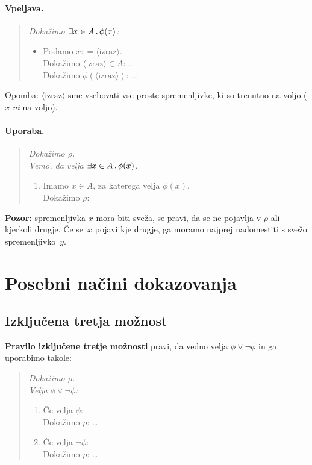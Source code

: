 \paragraph{Vpeljava.}
\begin{quote}
  \sl
  Dokažimo $\exists x \in A \,.\, \phi(x)$:
  \begin{itemize}
  \item[] Podamo $x \mathbin{{:}{=}} \langle\text{izraz}\rangle$. \\
          Dokažimo $\langle\text{izraz}\rangle \in A$: \quad \dots \\
          Dokažimo $\phi(\langle\text{izraz}\rangle)$: \quad \dots
  \end{itemize}
\end{quote}
%
Opomba: $\langle\text{izraz}\rangle$ sme vsebovati vse proste spremenljivke, ki so trenutno na voljo ($x$ \emph{ni} na
voljo).

\paragraph{Uporaba.}
\begin{quote}
  \sl
  Dokažimo $\rho$.\\
  Vemo, da velja $\exists x \in A \,.\, \phi(x)$.
  \begin{enumerate}
  \item[] Imamo $x \in A$, za katerega velja $\phi(x)$.\\
       Dokažimo $\rho$: \quad {}
  \end{enumerate}
\end{quote}
%
\textbf{Pozor:} spremenljivka $x$ mora biti sveža, se pravi, da se ne pojavlja v $\rho$ ali kjerkoli drugje. Če se~$x$ pojavi kje drugje, ga moramo najprej nadomestiti s svežo spremenljivko~$y$.

\section{Posebni načini dokazovanja}

\subsection{Izključena tretja možnost}

\textbf{Pravilo izključene tretje možnosti} pravi, da vedno velja $\phi \lor \lnot\phi$ in ga uporabimo takole:
%
\begin{quote}
  \sl
  Dokažimo $\rho$.\\
  Velja $\phi \lor \lnot \phi$:
  \begin{enumerate}
  \item Če velja $\phi$:\\
        Dokažimo $\rho$: \quad \dots
  \item Če velja $\lnot\phi$: \\
        Dokažimo $\rho$: \quad \dots
  \end{enumerate}
\end{quote}
%

